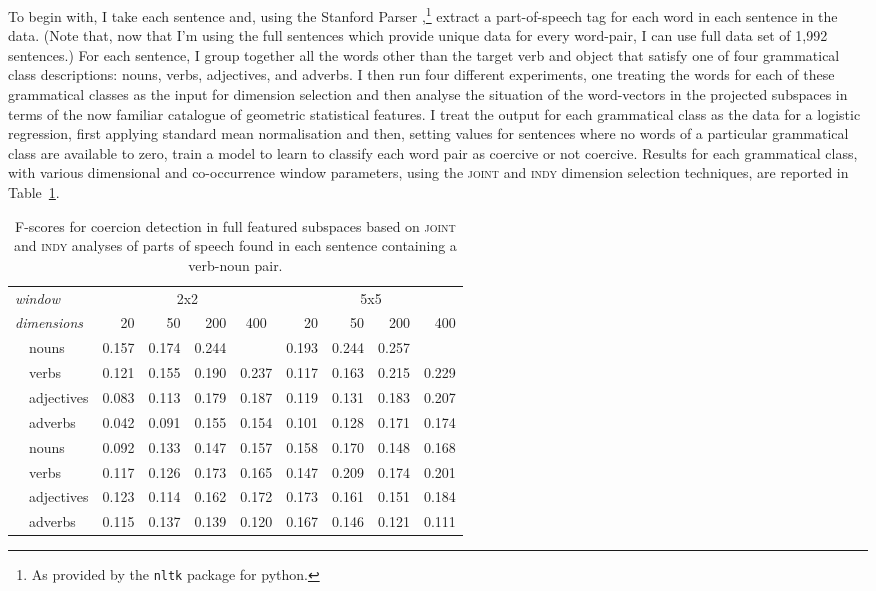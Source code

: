 To begin with, I take each sentence and, using the Stanford Parser \citep{ToutanovaEA2000},\footnote{As provided by the \texttt{nltk} package for python.} extract a part-of-speech tag for each word in each sentence in the data.  (Note that, now that I'm using the full sentences which provide unique data for every word-pair, I can use full data set of 1,992 sentences.)  For each sentence, I group together all the words other than the target verb and object that satisfy one of four grammatical class descriptions: nouns, verbs, adjectives, and adverbs.  I then run four different experiments, one treating the words for each of these grammatical classes as the input for dimension selection and then analyse the situation of the word-vectors in the projected subspaces in terms of the now familiar catalogue of geometric statistical features.  I treat the output for each grammatical class as the data for a logistic regression, first applying standard mean normalisation and then, setting values for sentences where no words of a particular grammatical class are available to zero, train a model to learn to classify each word pair as coercive or not coercive.  Results for each grammatical class, with various dimensional and co-occurrence window parameters, using the \textsc{joint} and \textsc{indy} dimension selection techniques, are reported in Table~\ref{tab:poses}.

\begin{table}
\centering
\begin{tabular}{llrrrr|rrrr}
\hline
\multicolumn{2}{l}{\emph{window}} & \multicolumn{4}{c}{2x2} & \multicolumn{4}{c}{5x5} \\
\multicolumn{2}{l}{\emph{dimensions}} & 20 & 50 & 200 & \multicolumn{1}{c}{400} & 20 & 50 & 200 & 400 \\
\hline
\parbox[t]{2mm}{} & nouns & 0.157 & 0.174 & 0.244 &  & 0.193 & 0.244 & 0.257 &  \\
& verbs & 0.121 & 0.155 & 0.190 & 0.237 & 0.117 & 0.163 & 0.215 & 0.229 \\
& adjectives & 0.083 & 0.113 & 0.179 & 0.187 & 0.119 & 0.131 & 0.183 & 0.207 \\
& adverbs & 0.042 & 0.091 & 0.155 & 0.154 & 0.101 & 0.128 & 0.171 & 0.174 \\
\hline
\parbox[t]{2mm}{} & nouns & 0.092 & 0.133 & 0.147 & 0.157 & 0.158 & 0.170 & 0.148 & 0.168 \\
& verbs & 0.117 & 0.126 & 0.173 & 0.165 & 0.147 & 0.209 & 0.174 & 0.201 \\
& adjectives & 0.123 & 0.114 & 0.162 & 0.172 & 0.173 & 0.161 & 0.151 & 0.184 \\
& adverbs & 0.115 & 0.137 & 0.139 & 0.120 & 0.167 & 0.146 & 0.121 & 0.111 \\
\hline
\end{tabular}
\caption[Correlations for Part-of-Speech Based Subspaces]{F-scores for coercion detection in full featured subspaces based on \textsc{joint} and \textsc{indy} analyses of parts of speech found in each sentence containing a verb-noun pair.}
\label{tab:poses}
\end{table}

